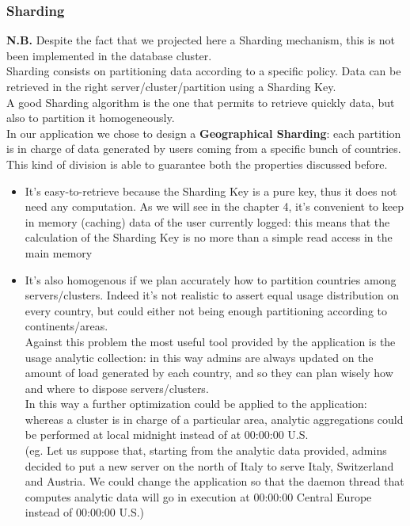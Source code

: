 \subsubsection{Sharding}
\textbf{N.B.} Despite the fact that we projected here a Sharding mechanism, this is not been implemented in the database cluster. \medskip \\
Sharding consists on partitioning data according to a specific policy. Data can be retrieved in the right server/cluster/partition using a Sharding Key.\\
A good Sharding algorithm is the one that permits to retrieve quickly data, but also to partition it homogeneously.\\
In our application we chose to design a \textbf{Geographical Sharding}: each partition is in charge of data generated by users coming from a specific bunch of countries. This kind of division is able to guarantee both the properties discussed before.
\begin{itemize}
	\item It’s easy-to-retrieve because the Sharding Key is a pure key, thus it does not need any computation. As we will see in the chapter 4, it’s convenient to keep in memory (caching) data of the user currently logged: this means that the calculation of the Sharding Key is no more than a simple read access in the main memory
	\item It’s also homogenous if we plan accurately how to partition countries among servers/clusters. Indeed it’s not realistic to assert equal usage distribution on every country, but could either not being enough partitioning according to continents/areas.\\
	Against this problem the most useful tool provided by the application is the usage analytic collection: in this way admins are always updated on the amount of load generated by each country, and so they can plan wisely how and where to dispose servers/clusters.\\
	In this way a further optimization could be applied to the application: whereas a cluster is in charge of a particular area, analytic aggregations could be performed  at local midnight instead of at 00:00:00 U.S.\\
	(eg. Let us suppose that, starting from the analytic data provided, admins decided to put a new server on the north of Italy to serve Italy, Switzerland and Austria. We could change the application so that the daemon thread that computes analytic data will go in execution at 00:00:00 Central Europe instead of 00:00:00 U.S.)
\end{itemize}
